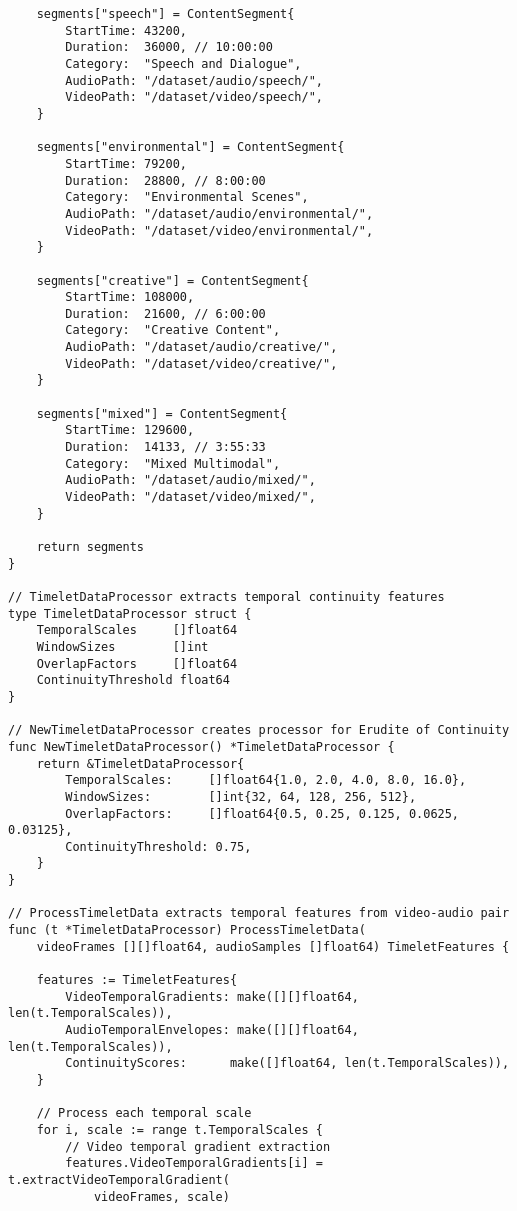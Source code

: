 \begin{tcolorbox}[colback=CodeBackground, colframe=DarkGray, title=Video-Audio Dataset Processing, fonttitle=\bfseries]
\begin{verbatim}
    segments["speech"] = ContentSegment{
        StartTime: 43200,
        Duration:  36000, // 10:00:00
        Category:  "Speech and Dialogue",
        AudioPath: "/dataset/audio/speech/",
        VideoPath: "/dataset/video/speech/",
    }
    
    segments["environmental"] = ContentSegment{
        StartTime: 79200,
        Duration:  28800, // 8:00:00
        Category:  "Environmental Scenes",
        AudioPath: "/dataset/audio/environmental/",
        VideoPath: "/dataset/video/environmental/",
    }
    
    segments["creative"] = ContentSegment{
        StartTime: 108000,
        Duration:  21600, // 6:00:00
        Category:  "Creative Content",
        AudioPath: "/dataset/audio/creative/",
        VideoPath: "/dataset/video/creative/",
    }
    
    segments["mixed"] = ContentSegment{
        StartTime: 129600,
        Duration:  14133, // 3:55:33
        Category:  "Mixed Multimodal",
        AudioPath: "/dataset/audio/mixed/",
        VideoPath: "/dataset/video/mixed/",
    }
    
    return segments
}

// TimeletDataProcessor extracts temporal continuity features
type TimeletDataProcessor struct {
    TemporalScales     []float64
    WindowSizes        []int
    OverlapFactors     []float64
    ContinuityThreshold float64
}

// NewTimeletDataProcessor creates processor for Erudite of Continuity
func NewTimeletDataProcessor() *TimeletDataProcessor {
    return &TimeletDataProcessor{
        TemporalScales:     []float64{1.0, 2.0, 4.0, 8.0, 16.0},
        WindowSizes:        []int{32, 64, 128, 256, 512},
        OverlapFactors:     []float64{0.5, 0.25, 0.125, 0.0625, 0.03125},
        ContinuityThreshold: 0.75,
    }
}

// ProcessTimeletData extracts temporal features from video-audio pair
func (t *TimeletDataProcessor) ProcessTimeletData(
    videoFrames [][]float64, audioSamples []float64) TimeletFeatures {
    
    features := TimeletFeatures{
        VideoTemporalGradients: make([][]float64, len(t.TemporalScales)),
        AudioTemporalEnvelopes: make([][]float64, len(t.TemporalScales)),
        ContinuityScores:      make([]float64, len(t.TemporalScales)),
    }
    
    // Process each temporal scale
    for i, scale := range t.TemporalScales {
        // Video temporal gradient extraction
        features.VideoTemporalGradients[i] = t.extractVideoTemporalGradient(
            videoFrames, scale)
        

\end{verbatim}
\end{tcolorbox}
